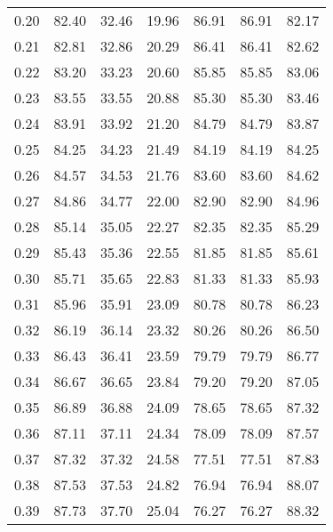 \begin{tabular}{|c|c|c|c|c|c|c|}
      0.20 &     82.40 &     32.46 &      19.96 &   86.91 &      86.91 &         82.17 \\
      0.21 &     82.81 &     32.86 &      20.29 &   86.41 &      86.41 &         82.62 \\
      0.22 &     83.20 &     33.23 &      20.60 &   85.85 &      85.85 &         83.06 \\
      0.23 &     83.55 &     33.55 &      20.88 &   85.30 &      85.30 &         83.46 \\
      0.24 &     83.91 &     33.92 &      21.20 &   84.79 &      84.79 &         83.87 \\
      0.25 &     84.25 &     34.23 &      21.49 &   84.19 &      84.19 &         84.25 \\
      0.26 &     84.57 &     34.53 &      21.76 &   83.60 &      83.60 &         84.62 \\
      0.27 &     84.86 &     34.77 &      22.00 &   82.90 &      82.90 &         84.96 \\
      0.28 &     85.14 &     35.05 &      22.27 &   82.35 &      82.35 &         85.29 \\
      0.29 &     85.43 &     35.36 &      22.55 &   81.85 &      81.85 &         85.61 \\
      0.30 &     85.71 &     35.65 &      22.83 &   81.33 &      81.33 &         85.93 \\
      0.31 &     85.96 &     35.91 &      23.09 &   80.78 &      80.78 &         86.23 \\
      0.32 &     86.19 &     36.14 &      23.32 &   80.26 &      80.26 &         86.50 \\
      0.33 &     86.43 &     36.41 &      23.59 &   79.79 &      79.79 &         86.77 \\
      0.34 &     86.67 &     36.65 &      23.84 &   79.20 &      79.20 &         87.05 \\
      0.35 &     86.89 &     36.88 &      24.09 &   78.65 &      78.65 &         87.32 \\
      0.36 &     87.11 &     37.11 &      24.34 &   78.09 &      78.09 &         87.57 \\
      0.37 &     87.32 &     37.32 &      24.58 &   77.51 &      77.51 &         87.83 \\
      0.38 &     87.53 &     37.53 &      24.82 &   76.94 &      76.94 &         88.07 \\
      0.39 &     87.73 &     37.70 &      25.04 &   76.27 &      76.27 &         88.32 \\

\end{tabular}
